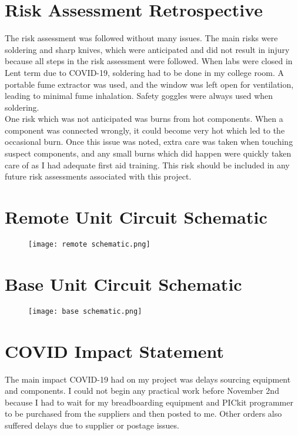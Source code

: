 \section{Risk Assessment Retrospective}
The risk assessment was followed without many issues. The main risks were soldering and sharp knives, which were anticipated and did not result in injury because all steps in the risk assessment were followed. When labs were closed in Lent term due to COVID-19, soldering had to be done in my college room. A portable fume extractor was used, and the window was left open for ventilation, leading to minimal fume inhalation. Safety goggles were always used when soldering.\\

One risk which was not anticipated was burns from hot components. When a component was connected wrongly, it could become very hot which led to the occasional burn. Once this issue was noted, extra care was taken when touching suspect components, and any small burns which did happen were quickly taken care of as I had adequate first aid training. This risk should be included in any future risk assessments associated with this project.\\

\newpage
\section{Remote Unit Circuit Schematic}
\begin{figure}[h!]
	\centering
	\texttt{[image: remote schematic.png]}
\end{figure}

\newpage
\section{Base Unit Circuit Schematic}
\begin{figure}[h!]
	\centering
	\texttt{[image: base schematic.png]}
\end{figure}


\newpage
\section{COVID Impact Statement}
The main impact COVID-19 had on my project was delays sourcing equipment and components. I could not begin any practical work before November 2nd because I had to wait for my breadboarding equipment and PICkit programmer to be purchased from the suppliers and then posted to me. Other orders also suffered delays due to supplier or postage issues.\\

